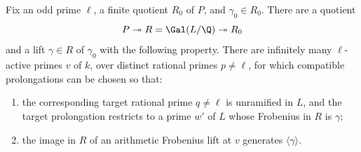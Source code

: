 \begin{proposition}\label{prop:frobenius-generation}
Fix an odd prime $\ell$, a finite quotient $R_0$ of $P$, and
$\gamma_0\in R_0$. There are a quotient
\[
 P\twoheadrightarrow R=\Gal(L/\Q)\twoheadrightarrow R_0
\]
and a lift $\gamma\in R$ of $\gamma_0$ with the following property.
There are infinitely many $\ell$-active primes $v$ of $k$, over
distinct rational primes $p\ne\ell$, for which compatible
prolongations can be chosen so that:
\begin{enumerate}
\item the corresponding target rational prime $q\ne\ell$ is unramified
in $L$, and the target prolongation restricts to a prime $w'$ of $L$
whose Frobenius in $R$ is $\gamma$;
\item the image in $R$ of an arithmetic Frobenius lift at $v$ generates
$\langle\gamma\rangle$.
\end{enumerate}
\end{proposition}


